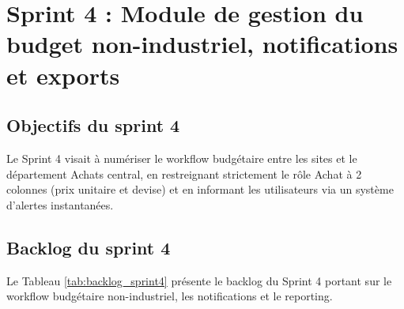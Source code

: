 \section{Sprint 4 : Module de gestion du budget non-industriel, notifications et exports}

\subsection{Objectifs du sprint 4}
Le Sprint 4 visait à numériser le workflow budgétaire entre les sites et le département Achats central, en restreignant strictement le rôle Achat à 2 colonnes (prix unitaire et devise) et en informant les utilisateurs via un système d'alertes instantanées.

\subsection{Backlog du sprint 4}
Le Tableau \ref{tab:backlog_sprint4} présente le backlog du Sprint 4 portant sur le workflow budgétaire non-industriel, les notifications et le reporting.

